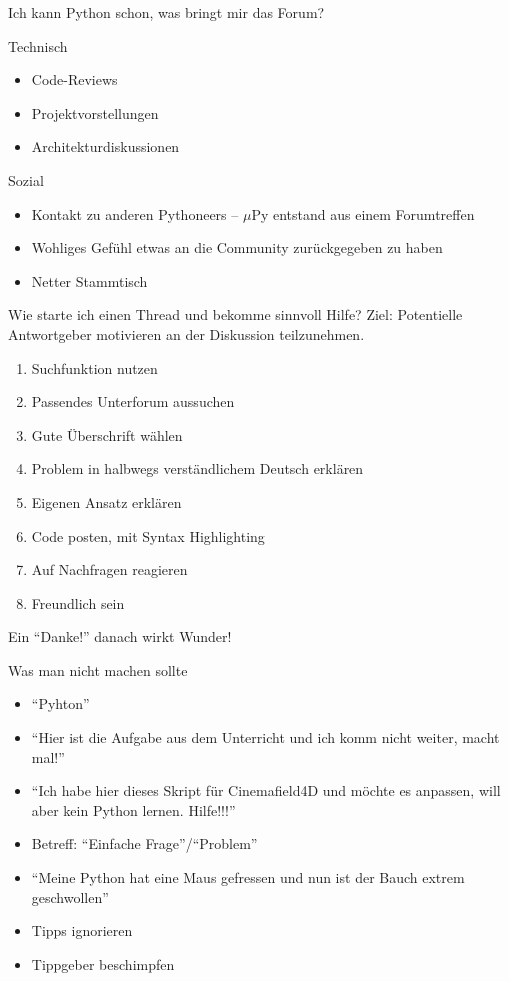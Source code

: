\documentclass{beamer}
\begin{document}
\begin{frame}{Ich kann Python schon, was bringt mir das Forum?}
  \begin{block}{Technisch}
    \begin{itemize}
      \item Code-Reviews
      \item Projektvorstellungen
      \item Architekturdiskussionen
    \end{itemize}
  \end{block}
  \begin{block}{Sozial}
    \begin{itemize}
      \item Kontakt zu anderen Pythoneers – $\mu$Py entstand aus einem Forumtreffen
      \item Wohliges Gefühl etwas an die Community zurückgegeben zu haben 
      \item Netter Stammtisch
    \end{itemize}
  \end{block}
\end{frame}

\begin{frame}{Wie starte ich einen Thread und bekomme sinnvoll Hilfe?}
  Ziel: Potentielle Antwortgeber motivieren an der Diskussion teilzunehmen.
  \begin{enumerate}
    \item Suchfunktion nutzen
    \item Passendes Unterforum aussuchen
    \item Gute Überschrift wählen
    \item Problem in halbwegs verständlichem Deutsch erklären
    \item Eigenen Ansatz erklären
    \item Code posten, mit Syntax Highlighting
    \item Auf Nachfragen reagieren
    \item Freundlich sein
  \end{enumerate}
  Ein \enquote{Danke!} danach wirkt Wunder!
\end{frame}

\begin{frame}{Was man nicht machen sollte}
  \begin{itemize}
    \item \enquote{Pyhton} 
    \item \enquote{Hier ist die Aufgabe aus dem Unterricht und ich komm nicht weiter,
      macht mal!}
    \item \enquote{Ich habe hier dieses Skript für Cinemafield4D und möchte es
      anpassen, will aber kein Python lernen. Hilfe!!!}
    \item Betreff: \enquote{Einfache Frage}/\enquote{Problem}
    \item \enquote{Meine Python hat eine Maus gefressen und nun ist der Bauch extrem geschwollen} 
    \item Tipps ignorieren
    \item Tippgeber beschimpfen
  \end{itemize}
\end{frame}
\end{document}
